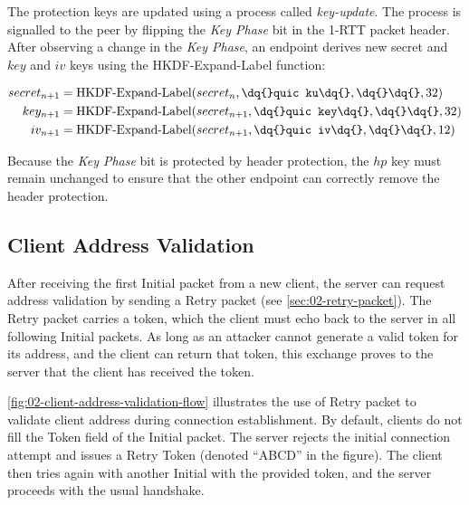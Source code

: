 The protection keys are updated using a process called \textit{\gls{key-update}}. The process is
signalled to the peer by flipping the \textit{Key Phase} bit in the 1-RTT packet header. After
observing a change in the \textit{Key Phase}, an endpoint derives new secret and $key$ and $iv$ keys
using the HKDF-Expand-Label function:

\begin{equation*}
  \begin{split}
    secret_{n+1} & = \operatorname{HKDF-Expand-Label}(secret_{n}, \texttt{\dq{}quic ku\dq{}}, \texttt{\dq{}\dq{}}, 32) \\
    key_{n+1} & = \operatorname{HKDF-Expand-Label}(secret_{n+1}, \texttt{\dq{}quic key\dq{}}, \texttt{\dq{}\dq{}}, 32) \\
    iv_{n+1} & = \operatorname{HKDF-Expand-Label}(secret_{n+1}, \texttt{\dq{}quic iv\dq{}}, \texttt{\dq{}\dq{}}, 12) \\
  \end{split}
\end{equation*}

Because the \textit{Key Phase} bit is protected by header protection, the $hp$ key must remain
unchanged to ensure that the other endpoint can correctly remove the header protection.

\subsection{Client Address Validation}\label{sec:02-address-validation}

After receiving the first Initial packet from a new client, the server can request address
validation by sending a Retry packet (see \autoref{sec:02-retry-packet}). The Retry packet carries a
token, which the client must echo back to the server in all following Initial packets. As long as an
attacker cannot generate a valid token for its address, and the client can return that token, this
exchange proves to the server that the client has received the token.

\autoref{fig:02-client-address-validation-flow} illustrates the use of Retry packet to validate
client address during connection establishment. By default, clients do not fill the Token field of
the Initial packet. The server rejects the initial connection attempt and issues a Retry Token
(denoted ``ABCD'' in the figure). The client then tries again with another Initial with the provided
token, and the server proceeds with the usual handshake.

